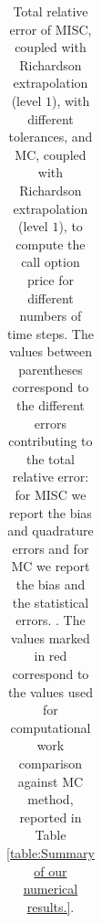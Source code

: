 \begin{table}[h!]
\begin{tabular}{l*{6}{c}r}
		\bottomrule[1.25pt]
	\end{tabular}
	\caption{Total relative error of MISC, coupled with Richardson extrapolation (level $1$), with different tolerances,  and MC, coupled with Richardson extrapolation (level $1$), to compute the call option price  for different numbers of time steps. The values between parentheses correspond to the different errors contributing to the total relative error: for MISC we report the bias and quadrature errors and for MC we report the bias and the statistical errors. . The values marked in red correspond to the values used for computational work comparison against MC method, reported in Table \ref{table:Summary of our numerical results.}.}
	\label{Total  error of MISC and MC to compute Call option price of the different tolerances for different number of time steps. Case set $2$ parameters, with Richardson extrapolation(level $1$). The numbers between parentheses are the corresponding absolute errors,relative}
\end{table}
\FloatBarrier



